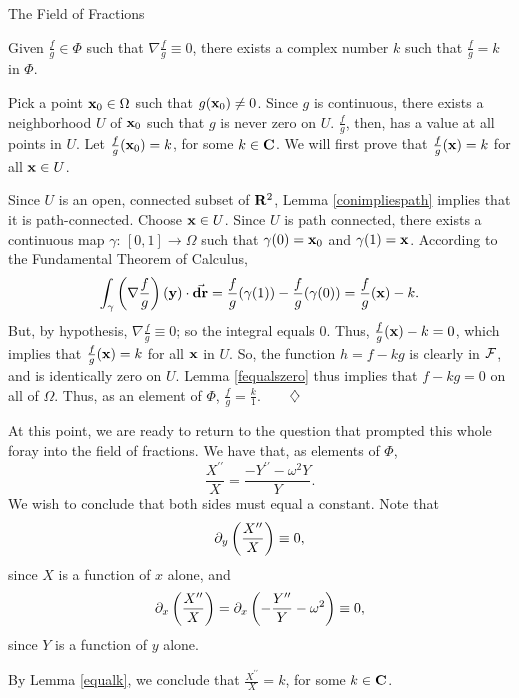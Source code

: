 \begin{section}{The Field of Fractions}
\begin{lemma}
\label{equalk}
Given $\frac{f}{g} \in \Phi$ such that $\nabla \frac{f}{g} \equiv 0$, there exists a complex number $k$ such that $\frac{f}{g} = k$ in $\Phi$.
\end{lemma}

\proof
Pick a point $\mathbf{x}_0 \in \Omega$ such that $g(\mathbf{x}_0) \not= 0$.  Since $g$ is continuous, there exists a neighborhood $U$ of $\mathbf{x}_0$ such that $g$ is never zero on $U$.  $\frac{f}{g}$, then, has a value at all points in $U$.  Let $\frac{f}{g}(\mathbf{x}_0) = k$, for some $k \in \mathbf{C}$.  We will first prove that $\frac{f}{g}(\mathbf{x}) = k$ for all $\mathbf{x} \in U$.

Since $U$ is an open, connected subset of $\mathbf{R}^2$, Lemma \ref{conimpliespath} implies that it is path-connected.  Choose $\mathbf{x} \in U$.  Since $U$ is path connected, there exists a continuous map $\gamma$: $[0,1] \rightarrow \Omega$ such that $\gamma(0) = \mathbf{x}_0$ and $\gamma(1) = \mathbf{x}$.  According to the Fundamental Theorem of Calculus,
\[
\int_\gamma \left( \nabla\frac{f}{g} \right) (\mathbf{y}) \cdot \vec{\mathbf{dr}} = \frac{f}{g}(\gamma(1)) - \frac{f}{g}(\gamma(0)) = \frac{f}{g}(\mathbf{x}) - k.
\]
But, by hypothesis, $\nabla\frac{f}{g} \equiv 0$; so the integral equals 0.  Thus, $\frac{f}{g}(\mathbf{x}) - k = 0$, which implies that $\frac{f}{g}(\mathbf{x}) = k$ for all $\mathbf{x}$ in $U$.  So, the function $h = f - k g$ is clearly in $\mathcal{F}$, and is identically zero on $U$.  Lemma \ref{fequalszero} thus implies that $f - k g = 0$ on all of $\Omega$.  Thus, as an element of $\Phi$, $\frac{f}{g} = \frac{k}{1}$.$\qquad \diamondsuit$

\eex

At this point, we are ready to return to the question that prompted this whole foray into the field of fractions.  We have that, as elements of $\Phi$,
\[
\frac{X^{\prime\prime}}{X} = \frac{-Y^{\prime\prime} - \omega^2 Y}{Y}.
\]
We wish to conclude that both sides must equal a constant.  Note that
\[
\partial_{y} \left( \frac{X^{\prime\prime}}{X} \right) \equiv 0,
\]
since $X$ is a function of $x$ alone, and
\[
\partial_{x} \left( \frac{X^{\prime\prime}}{X} \right) = \partial_{x} \left( -\frac{Y^{\prime\prime}}{Y} - \omega^2 \right) \equiv 0,
\]
since $Y$ is a function of $y$ alone.

By Lemma \ref{equalk}, we conclude that $\frac{X^{\prime\prime}}{X} = k$, for some $k \in \mathbf{C}$.
\end{section}


